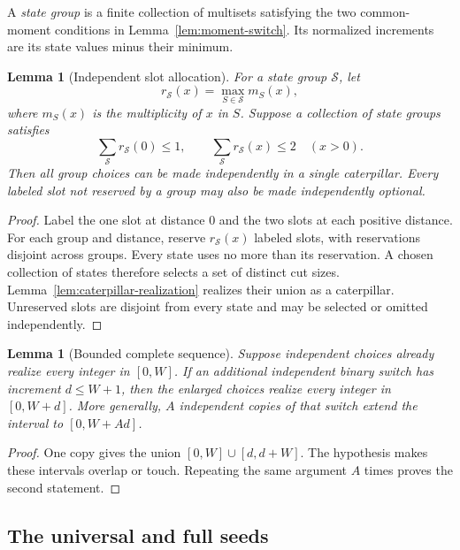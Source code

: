 \documentclass[11pt]{article}
\newtheorem{lemma}[theorem]{Lemma}
\theoremstyle{definition}
\theoremstyle{remark}
\begin{document}
A \emph{state group} is a finite collection of multisets satisfying the two
common-moment conditions in Lemma~\ref{lem:moment-switch}.  Its normalized
increments are its state values minus their minimum.

\begin{lemma}[Independent slot allocation]\label{lem:slot-allocation}
For a state group $\mathcal S$, let
\[
  r_{\mathcal S}(x)=\max_{S\in\mathcal S}m_S(x),
\]
where $m_S(x)$ is the multiplicity of $x$ in $S$.  Suppose a collection of
state groups satisfies
\[
  \sum_{\mathcal S}r_{\mathcal S}(0)\le1,
  \qquad
  \sum_{\mathcal S}r_{\mathcal S}(x)\le2\quad(x>0).
\]
Then all group choices can be made independently in a single caterpillar.
Every labeled slot not reserved by a group may also be made independently
optional.
\end{lemma}

\begin{proof}
Label the one slot at distance $0$ and the two slots at each positive distance.
For each group and distance, reserve $r_{\mathcal S}(x)$ labeled slots, with
reservations disjoint across groups.  Every state uses no more than its
reservation.  A chosen collection of states therefore selects a set of
distinct cut sizes.  Lemma~\ref{lem:caterpillar-realization} realizes their
union as a caterpillar.  Unreserved slots are disjoint from every state and may
be selected or omitted independently.
\end{proof}

\begin{lemma}[Bounded complete sequence]\label{lem:complete-sequence}
Suppose independent choices already realize every integer in $[0,W]$.
If an additional independent binary switch has increment $d\le W+1$, then the
enlarged choices realize every integer in $[0,W+d]$.  More generally, $A$
independent copies of that switch extend the interval to $[0,W+Ad]$.
\end{lemma}

\begin{proof}
One copy gives the union $[0,W]\cup[d,d+W]$.  The hypothesis makes these
intervals overlap or touch.  Repeating the same argument $A$ times proves the
second statement.
\end{proof}

\subsection{The universal and full seeds}
\end{document}
